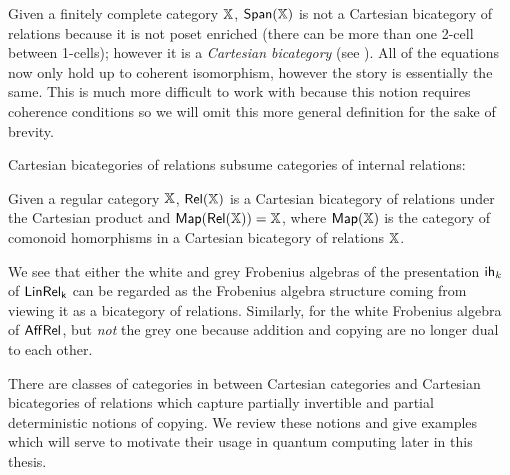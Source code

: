 
Given a finitely complete category $\mathbb{X}$, $\mathsf{Span}(\mathbb{X})$ is not a Cartesian bicategory of relations because it is not poset enriched (there can be more than one 2-cell between 1-cells); however it is a {\em Cartesian bicategory} (see \cite{carbonia}).  All of the equations now only hold up to coherent isomorphism, however the story is essentially the same. This is much more difficult to work with because this notion requires coherence conditions so we will omit this more general definition for the sake of brevity. 


Cartesian bicategories of relations subsume categories of internal relations:
\begin{example}
Given a regular category $\mathbb{X}$, $\mathsf{Rel}(\mathbb{X})$ is a Cartesian bicategory of relations under the Cartesian product and ${\sf Map}(\mathsf{Rel}(\mathbb{X}))=\mathbb{X}$, where ${\sf Map}(\mathbb{X})$ is the category of comonoid homorphisms in a Cartesian bicategory of relations $\mathbb{X}$.
\end{example}
We see that either the white and grey Frobenius algebras of the presentation ${\sf ih}_k$ of $\sf LinRel_k$ can be regarded as the Frobenius algebra structure coming from viewing it as a bicategory of relations.  Similarly, for the white Frobenius algebra of  $\mathsf{Aff}\mathsf{Rel}$, but {\em not} the grey one because addition and copying are no longer dual to each other.




There are classes of categories in between Cartesian categories and Cartesian bicategories of relations which capture partially invertible and partial deterministic notions of copying.  We review these notions and give examples which will serve to motivate their usage in quantum computing later in this thesis.





